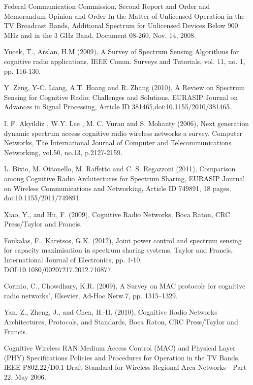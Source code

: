 \documentclass
[journal,11pt,draftclsnofoot,onecolumn,doublespace]{tETN2e}
\begin{document}
\begin{thebibliography}{9}
Federal Communication Commission, Second Report and Order and Memorandum Opinion and Order In the Matter of Unlicensed Operation in the TV Broadcast Bands, Additional Spectrum for Unlicensed Devices Below 900 MHz and in the 3 GHz Band, Document 08-260, Nov. 14, 2008.

Yucek, T., Arslan, H.M (2009), A Survey of Spectrum Sensing Algorithms for cognitive radio applications, IEEE Comm. Surveys and Tutorials, vol. 11, no. 1, pp. 116-130.

Y. Zeng, Y-C. Liang, A.T. Hoang and R. Zhang (2010), A Review on Spectrum Sensing for Cognitive Radio: Challenges and Solutions, EURASIP Journal on Advances in Signal Processing, Article ID 381465,doi:10.1155/2010/381465.   

I. F. Akyildiz , W.Y. Lee , M. C. Vuran and S. Mohanty (2006), Next generation  dynamic spectrum access  cognitive radio wireless networks  a survey, Computer Networks, The International Journal of Computer and Telecommunications Networking, vol.50, no.13, p.2127-2159.

L. Bixio, M. Ottonello, M. Raffetto and C. S. Regazzoni (2011), Comparison among Cognitive Radio Architectures for Spectrum Sharing, EURASIP Journal on Wireless Communications and Networking, Article ID 749891, 18 pages, doi:10.1155/2011/749891.

Xiao, Y., and Hu, F. (2009), Cognitive Radio Networks, Boca Raton, CRC Press/Taylor and Francis. 

Foukalas, F., Karetsos, G.K. (2012), Joint power control and spectrum sensing for capacity maximisation in spectrum sharing systems, Taylor and Francis, International Journal of Electronics, pp. 1-10,
DOI:10.1080/00207217.2012.710877. 

Cormio, C., Chowdhury, K.R. (2009), A Survey on MAC protocols for cognitive radio networks’, Elsevier, Ad-Hoc Netw.7, pp. 1315–1329.

Yan, Z., Zheng, J., and Chen, H.-H. (2010), Cognitive Radio Networks  Architectures, Protocols, and Standards, Boca Raton, CRC Press/Taylor and Francis.

Cognitive Wireless RAN Medium Access Control (MAC) and Physical Layer (PHY) Specifications  Policies and Procedures for Operation in the TV Bands, IEEE P802.22/D0.1 Draft Standard for Wireless Regional Area Networks - Part 22. May 2006.


\end{thebibliography}
\end{document}
